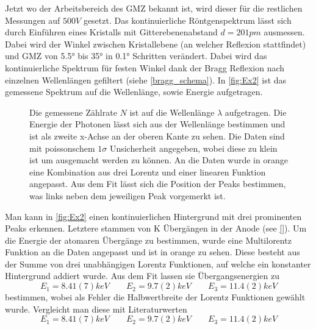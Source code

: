 Jetzt wo der Arbeitsbereich des GMZ bekannt ist, wird dieser für die restlichen Messungen auf \( 500 \unit{V} \) gesetzt. Das kontinuierliche Röntgenspektrum lässt sich durch Einführen eines  Kristalls mit Gitterebenenabstand \( d = 201 \unit{pm} \) ausmessen. Dabei wird der Winkel zwischen Kristallebene (an welcher Reflexion stattfindet) und GMZ von \ang{5.5} bis \ang{35} in \ang{0.1} Schritten verändert. Dabei wird das kontinuierliche Spektrum für festen Winkel dank der Bragg Reflexion nach einzelnen Wellenlängen gefiltert (siehe \autoref{bragg_schema}). In \autoref{fig:Ex2} ist das gemessene Spektrum auf die Wellenlänge, sowie Energie aufgetragen.

\begin{figure}[H]
	\centering
	\caption{Die gemessene Zählrate \( N \) ist auf die Wellenlänge \( \lambda \) aufgetragen. Die Energie der Photonen lässt sich aus der Wellenlänge bestimmen und ist als zweite x-Achse an der oberen Kante zu sehen. Die Daten sind mit poissonschem \( 1\sigma \) Unsicherheit angegeben, wobei diese zu klein ist um ausgemacht werden zu können. An die Daten wurde in orange eine Kombination aus drei Lorentz und einer linearen Funktion angepasst. Aus dem Fit lässt sich die Position der Peaks bestimmen, was links neben dem jeweiligen Peak vorgemerkt ist.}
	\label{fig:Ex2}
\end{figure}

Man kann in \autoref{fig:Ex2} einen kontinuierlichen Hintergrund mit drei prominenten Peaks erkennen. Letztere stammen von K Übergängen in der Anode (see \autoref{}). Um die Energie der atomaren Übergänge zu bestimmen, wurde eine Multilorentz Funktion an die Daten angepasst und ist in orange zu sehen. Diese besteht aus der Summe von drei unabhängigen Lorentz Funktionen, auf welche ein konstanter Hintergrund addiert wurde. Aus dem Fit lassen sie Übergangsenergien zu
\begin{equation*}
	E_1 = 8.41(7) \unit{keV} \qquad E_2 = 9.7(2) \unit{keV} \qquad E_3 = 11.4(2) \unit{keV}
\end{equation*}
bestimmen, wobei als Fehler die Halbwertbreite der Lorentz Funktionen gewählt wurde. Vergleicht man diese mit Literaturwerten \autocite{}
\begin{equation*}
	E_1 = 8.41(7) \unit{keV} \qquad E_2 = 9.7(2) \unit{keV} \qquad E_3 = 11.4(2) \unit{keV}
\end{equation*}


